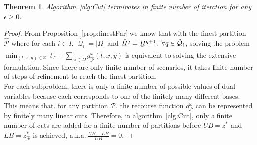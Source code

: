 \documentclass[11pt]{article}
\newtheorem{theorem}{Theorem}
\renewcommand{\underbar}{\underaccent{\bar}}
\begin{document}
	\begin{theorem} \label{thm:converge}
		Algorithm~\ref{alg:Cut} terminates in finite number of iteration for any \(\epsilon \geq 0\). 
	\end{theorem}
	\begin{proof}
		From Proposition~\ref{prop:finestPar} we know that with the finest partition \(\hat{\mathcal{P}}\) where for each \(i \in I\), \(|\hat{\mathcal{Q}}_i| = |\Omega|\) and \(\bar{H}^q = \underbar{H}^{q + 1},\ \forall q \in \hat{\mathcal{Q}}_i\), solving the problem \(\min_{(t,x,y) \in \mathbb{X}}\ t_T + \sum_{\omega \in \Omega} g^\omega_{\hat{\mathcal{P}}}(t,x,y)\) is equivalent to solving the extensive formulation. Since there are only finite number of scenarios, it takes finite number of steps of refinement to reach the finest partition. \\
		\newline
		For each subproblem, there is only a finite number of possible values of dual variables because each corresponds to one of the finitely many different bases. This means that, for any partition \(\mathcal{P}\), the recourse function \(g^\omega_{\mathcal{P}}\) can be represented by finitely many linear cuts. Therefore, in algorithm~\ref{alg:Cut}, only a finite number of cuts are added for a finite number of partitions before \(UB = z^*\) and \(LB = z^*_{\hat{\mathcal{P}}}\) is achieved, a.k.a. \(\frac{UB - LB}{UB} = 0\).
	\end{proof}
\end{document}

